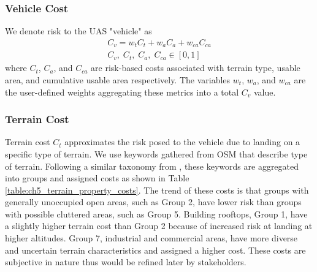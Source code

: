\subsubsection{Vehicle Cost}\label{sec:ch5_vehicle_cost}

We denote risk to the UAS "vehicle" as
\begin{align}
    C_v = w_t C_t + w_{a}C_{a} + w_{ca} C_{ca}\\
    C_v,\; C_t,\; C_a,\; C_{ca} \in [0,1]
\end{align}
where $C_t$, $C_a$, and $C_{ca}$ are risk-based costs associated with terrain type, usable area, and cumulative usable area respectively.  The variables $w_t$, $w_a$, and $w_{ca}$ are the user-defined weights aggregating these metrics into a total $C_v$ value.

\subsubsection{Terrain Cost}

Terrain cost $C_t$ approximates the risk posed to the vehicle due to landing on a specific type of terrain. We use keywords gathered from OSM that describe type of terrain. Following a similar taxonomy from \cite{di_donato_evaluating_2017}, these  keywords are aggregated into groups and assigned costs as shown in Table \ref{table:ch5_terrain_property_costs}.  The trend of these costs is that groups with generally unoccupied open areas, such as Group 2, have lower risk than groups with possible cluttered areas, such as Group 5. Building rooftops, Group 1, have a slightly higher terrain cost than Group 2 because of increased risk at landing at higher altitudes. Group 7, industrial and commercial areas, have more diverse and uncertain terrain characteristics and assigned a higher cost. These costs are subjective in nature thus would be refined later by stakeholders.


